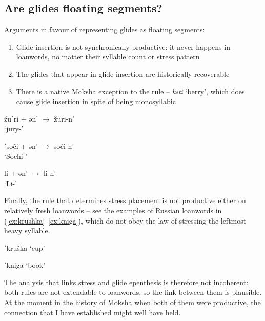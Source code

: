 \documentclass[a4paper, 12pt]{article}
\begin{document}
			\subsection{Are glides floating segments?}
			
	Arguments in favour of representing glides as floating segments:
	\begin{enumerate}[$\gg$]
	\setlength\itemsep{0em}
		\item Glide insertion is not synchronically productive: it never happens in loanwords, no matter their syllable count or stress pattern
		\item The glides that appear in glide insertion are historically recoverable \parencite[pp. 11--12]{bubrikh1953}
		\item There is a native Moksha exception to the rule -- \emph{ksti} `berry', which does cause glide insertion in spite of being monosyllabic \parencite[p. 42]{kozlov2018}
	\end{enumerate}
				
\begin{minipage}[t]{.3\linewidth}
\ex\label{ex:lw1s}
	žuˈri + ən' $\rightarrow$ žuri-n' \\`jury-{\Gen}' 
\xe
\end{minipage}
\hfill
\begin{minipage}[t]{.3\linewidth}
\ex\label{ex:lw2s}
	ˈsoči + ən' $\rightarrow$ soči-n' \\ `Sochi-{\Gen}'
\xe
\end{minipage}	
\hfill
\begin{minipage}[t]{.3\linewidth}
\ex\label{ex:lw3s}
	li + ən' $\rightarrow$ li-n' \\ `Li-{\Gen}'
\xe
\end{minipage}
		
	Finally, the rule that determines stress placement is not productive either on relatively fresh loanwords -- see the examples of Russian loanwords in (\ref{ex:krushka}--\ref{ex:kniga}), which do not obey the law of stressing the leftmost heavy syllable.
	
\begin{minipage}[t]{.45\linewidth}
\ex\label{ex:krushka}
	ˈkruška `cup'
\xe
\end{minipage}
\hfill
\begin{minipage}[t]{.45\linewidth}
\ex\label{ex:kniga}
	ˈkniga `book'
\xe
\end{minipage}	

	\noindent The analysis that links stress and glide epenthesis is therefore not incoherent: both rules are not extendable to loanwords, so the link between them is plausible. At the moment in the history of Moksha when both of them were productive, the connection that I have established might well have held.
	
\end{document}
